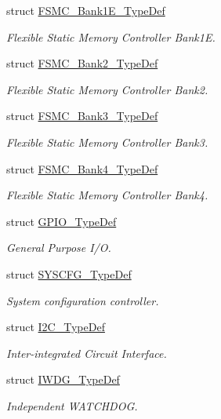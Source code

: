 \begin{DoxyCompactItemize}
struct \hyperlink{struct_f_s_m_c___bank1_e___type_def}{F\+S\+M\+C\+\_\+\+Bank1\+E\+\_\+\+Type\+Def}
\begin{DoxyCompactList}\small\item\em Flexible Static Memory Controller Bank1E. \end{DoxyCompactList}\item 
struct \hyperlink{struct_f_s_m_c___bank2___type_def}{F\+S\+M\+C\+\_\+\+Bank2\+\_\+\+Type\+Def}
\begin{DoxyCompactList}\small\item\em Flexible Static Memory Controller Bank2. \end{DoxyCompactList}\item 
struct \hyperlink{struct_f_s_m_c___bank3___type_def}{F\+S\+M\+C\+\_\+\+Bank3\+\_\+\+Type\+Def}
\begin{DoxyCompactList}\small\item\em Flexible Static Memory Controller Bank3. \end{DoxyCompactList}\item 
struct \hyperlink{struct_f_s_m_c___bank4___type_def}{F\+S\+M\+C\+\_\+\+Bank4\+\_\+\+Type\+Def}
\begin{DoxyCompactList}\small\item\em Flexible Static Memory Controller Bank4. \end{DoxyCompactList}\item 
struct \hyperlink{struct_g_p_i_o___type_def}{G\+P\+I\+O\+\_\+\+Type\+Def}
\begin{DoxyCompactList}\small\item\em General Purpose I/O. \end{DoxyCompactList}\item 
struct \hyperlink{struct_s_y_s_c_f_g___type_def}{S\+Y\+S\+C\+F\+G\+\_\+\+Type\+Def}
\begin{DoxyCompactList}\small\item\em System configuration controller. \end{DoxyCompactList}\item 
struct \hyperlink{struct_i2_c___type_def}{I2\+C\+\_\+\+Type\+Def}
\begin{DoxyCompactList}\small\item\em Inter-\/integrated Circuit Interface. \end{DoxyCompactList}\item 
struct \hyperlink{struct_i_w_d_g___type_def}{I\+W\+D\+G\+\_\+\+Type\+Def}
\begin{DoxyCompactList}\small\item\em Independent W\+A\+T\+C\+H\+D\+OG. \end{DoxyCompactList}\item 

\end{DoxyCompactItemize}

